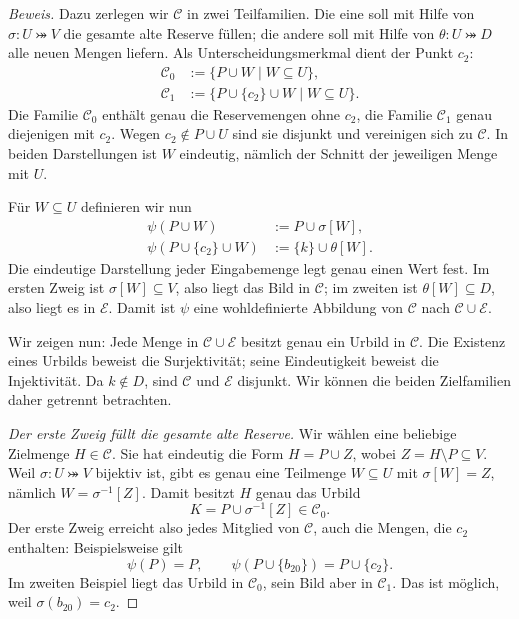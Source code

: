 \begin{proof}[Beweis]
Dazu zerlegen wir \(\mathcal C\) in zwei Teilfamilien.
Die eine soll mit Hilfe von \(\sigma\colon U\bij V\) die gesamte
alte Reserve füllen; die andere soll mit Hilfe von
\(\theta\colon U\bij D\) alle neuen Mengen liefern.
Als Unterscheidungsmerkmal dient der Punkt \(c_2\):
\[
  \begin{aligned}
    \mathcal C_0&:=\{P\cup W\mid W\subseteq U\},\\
    \mathcal C_1&:=\{P\cup\{c_2\}\cup W\mid W\subseteq U\}.
  \end{aligned}
\]
Die Familie \(\mathcal C_0\) enthält genau die Reservemengen ohne
\(c_2\), die Familie \(\mathcal C_1\) genau diejenigen mit
\(c_2\). Wegen \(c_2\notin P\cup U\) sind sie disjunkt und
vereinigen sich zu \(\mathcal C\). In beiden Darstellungen ist
\(W\) eindeutig, nämlich der Schnitt der jeweiligen Menge mit \(U\).

Für \(W\subseteq U\) definieren wir nun
\[
  \begin{aligned}
    \psi(P\cup W)&:=P\cup\sigma[W],\\
    \psi(P\cup\{c_2\}\cup W)&:=\{k\}\cup\theta[W].
  \end{aligned}
\]
Die eindeutige Darstellung jeder Eingabemenge legt genau einen Wert
fest. Im ersten Zweig ist \(\sigma[W]\subseteq V\), also liegt
das Bild in \(\mathcal C\); im zweiten ist
\(\theta[W]\subseteq D\), also liegt es in \(\mathcal E\).
Damit ist \(\psi\) eine wohldefinierte Abbildung von
\(\mathcal C\) nach \(\mathcal C\cup\mathcal E\).

\MogAbsorptionDiagram

Wir zeigen nun: Jede Menge in \(\mathcal C\cup\mathcal E\)
besitzt genau ein Urbild in \(\mathcal C\).
Die Existenz eines Urbilds beweist die Surjektivität;
seine Eindeutigkeit beweist die Injektivität.
Da \(k\notin D\), sind \(\mathcal C\) und \(\mathcal E\)
disjunkt. Wir können die beiden Zielfamilien daher getrennt betrachten.

\emph{Der erste Zweig füllt die gesamte alte Reserve.}
Wir wählen eine beliebige Zielmenge \(H\in\mathcal C\).
Sie hat eindeutig die Form \(H=P\cup Z\), wobei
\(Z=H\setminus P\subseteq V\). Weil \(\sigma\colon U\bij V\)
bijektiv ist, gibt es genau eine Teilmenge \(W\subseteq U\)
mit \(\sigma[W]=Z\), nämlich \(W=\sigma^{-1}[Z]\).
Damit besitzt \(H\) genau das Urbild
\[
  K=P\cup\sigma^{-1}[Z]\in\mathcal C_0.
\]
Der erste Zweig erreicht also jedes Mitglied von \(\mathcal C\),
auch die Mengen, die \(c_2\) enthalten: Beispielsweise gilt
\[
  \psi(P)=P,\qquad
  \psi(P\cup\{b_{20}\})=P\cup\{c_2\}.
\]
Im zweiten Beispiel liegt das Urbild in \(\mathcal C_0\), sein Bild
aber in \(\mathcal C_1\). Das ist möglich, weil
\(\sigma(b_{20})=c_2\).


\end{proof}
